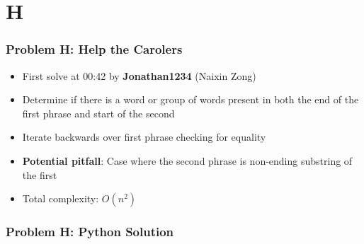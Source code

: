 \section{H}%
\label{sec:h}

\begin{frame}
  \frametitle{Problem H: Help the Carolers}

  \begin{itemize}
    \item First solve at 00:42 by \textbf{Jonathan1234} (Naixin Zong)
    \item Determine if there is a word or group of words present in both the end of the first phrase and start of the second
    \item Iterate backwards over first phrase checking for equality
    \item \textbf{Potential pitfall}: Case where the second phrase is non-ending substring of the first
    \item Total complexity: $O(n^2)$
  \end{itemize}
\end{frame}

\begin{frame}
  \frametitle{Problem H: Python Solution}
\end{frame}
